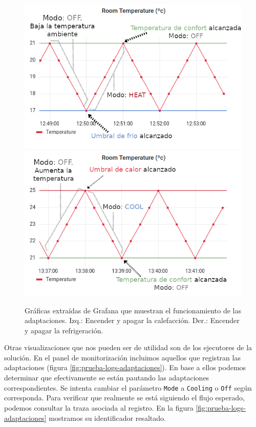 \begin{figure}[h]
  \hspace{-1.2cm}
  \includegraphics[scale=0.42]{cap_despliegue/images/pruebas-temperatura-calentar}
  \includegraphics[scale=0.42]{cap_despliegue/images/pruebas-temperatura-enfriar}
  \caption{Gráficas extraídas de Grafana que muestran el funcionamiento de las adaptaciones. Izq.: Encender y apagar la calefacción. Der.: Encender y apagar la refrigeración.}
  \label{fig:pruebas-temperatura}
\end{figure}

Otras visualizaciones que nos pueden ser de utilidad son  de los ejecutores de la solución. En el panel de monitorización incluimos aquellos que registran las adaptaciones (figura \ref{fig:prueba-logs-adaptaciones}). En base a ellos podemos determinar que efectivamente se están pautando las adaptaciones correspondientes. Se intenta cambiar el parámetro \texttt{Mode} a \texttt{Cooling} o \texttt{Off} según corresponda. Para verificar que realmente se está siguiendo el flujo esperado, podemos consultar la traza asociada al registro. En la figura \ref{fig:prueba-logs-adaptaciones} mostramos su identificador resaltado.

